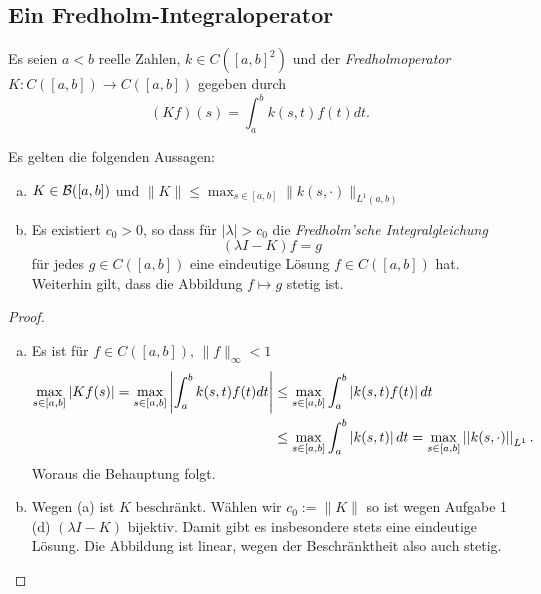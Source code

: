 \documentclass[FunkAnaSkript.tex]{subfiles}
\begin{document}
\subsection{Ein Fredholm-Integraloperator}
\label{B3.2}
	Es seien $a<b$ reelle Zahlen, $k\in C([a,b]^2)$ und der \textit{Fredholmoperator} $K:C([a,b]) \to C([a,b])$ gegeben durch 	
	$$ (Kf)(s) = \int^b_a k(s,t)f(t) dt.$$
	\begin{beh}
		Es gelten die folgenden Aussagen:
		\begin{enumerate}[(a)]
			\item $K\in \mathcal{B}([a,b])$ und $\| K \| \leq \max_{s\in[a,b]}\|k(s,\cdot) \|_{L^1(a,b)}$
			\item Es existiert $c_0 > 0$, so dass für $|\lambda| > c_0$ die \textit{Fredholm'sche Integralgleichung}
			$$(\lambda I - K)f = g$$
			für jedes $g \in C([a,b])$ eine eindeutige Lösung $f\in C([a,b])$ hat. Weiterhin gilt, dass die Abbildung $f\mapsto g$ stetig ist.
		\end{enumerate}
	\end{beh}
	\begin{proof}
		\begin{enumerate}[(a)]
		\item Es ist für $f \in C([a,b]),\, \|f\|_{\infty} < 1$
		\begin{equation*}
		\begin{split}
		\max_{s\in[a,b]} \left\lvert Kf(s) \right\rvert =  \max_{s\in[a,b]} \left\lvert \int^b_a k(s,t)f(t)dt \right\rvert 
		& \leq \max_{s\in[a,b]} \int^b_a \left\lvert  k(s,t)f(t) \right\rvert dt 
		\\ & \leq \max_{s\in[a,b]} \int^b_a \left\lvert  k(s,t) \right\rvert dt = \max_{s\in[a,b]} \left\lvert \left\lvert k(s,\cdot) \right\rvert \right\rvert_{L^1}.
		\end{split}
		\end{equation*}
		Woraus die Behauptung folgt.		
		\item Wegen (a) ist $K$ beschränkt. Wählen wir $c_0 := \|K\|$ so ist wegen Aufgabe 1 (d) $(\lambda I - K)$ bijektiv. Damit gibt es insbesondere stets eine eindeutige Lösung. Die Abbildung ist linear, wegen der Beschränktheit also auch stetig. 		
		
		\end{enumerate}
	\end{proof}

\end{document}
